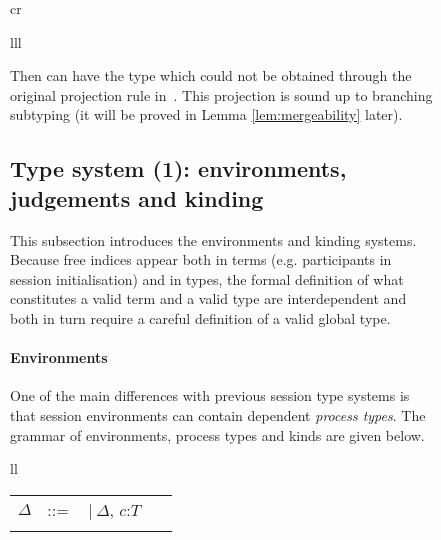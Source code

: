 \documentclass{LMCS}
\newcommand{\kf}[1]{\textup{\textsf{#1}}\xspace}
\newcommand{\ccc}{\ensuremath{c}}
\newcommand{\sep}{\ensuremath{~\mathbf{|}~ }}
\newcommand{\D}{\ensuremath{\Delta}}
\newcommand{\T}{\ensuremath{T}}
\newcommand{\Nat}{\kf{nat}}
\newcommand{\ii}{\ensuremath{i}}
\newcommand{\jj}{\ensuremath{j}}
\newcommand{\II}{\ensuremath{I}}
\newcommand{\Type}{\kf{Type}}
\newcommand{\AT}[2]{#1\! : \! #2}
\newcommand{\ParT}{U_p}
\begin{document}
{\begin{figure}[t]
\begin{tabular}{cr}
{\begin{array}{lll}
{\small}

Then  can have the type  which
could not be obtained through the original projection rule
in~\cite{CHY07,BettiniCDLDY08LONG}.
This projection is sound 
up to branching subtyping 
(it will be proved in Lemma \ref{lem:mergeability} later).

\subsection{Type system (1): environments, judgements and kinding}
\noindent 
This subsection introduces the environments and kinding systems. 
Because free indices appear both in terms (e.g.
participants in session initialisation) and in types, the formal definition of
what constitutes a valid term and a valid type are interdependent and
both in turn require a careful definition of a valid global type.

\paragraph{\bf Environments}
One of the main differences with previous session type systems is that session
environments  can contain dependent {\em process types}.  The grammar of environments, process
types and kinds are given below.
\begin{center}
\small
\begin{tabular}{ll}
\begin{tabular}{rcl@{\quad}l}
\D & ::= &  \sep \D, \ccc:\T\
\begin{array}{l}
\kappa ::= \Pi \jj:I.\kappa \sep \Type 
\quad \quad \quad 
\ParT :: = \Nat \sep \Pi\AT{\ii}{\II}.{U_p}\\
\end{array}


\end{tabular}
\end{tabular}
\end{center}
\end{array}}
\end{tabular}
\end{figure}}
\end{document}
